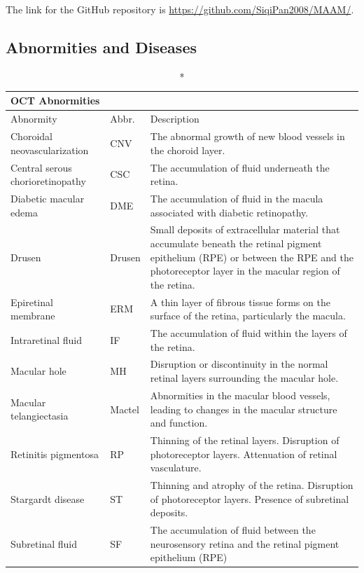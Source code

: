\documentclass{article}
\begin{document}
	The link for the GitHub repository is \url{https://github.com/SiqiPan2008/MAAM/}.
	
	\subsection*{Abnormities and Diseases}
	
	{
		\fontsize{9}{12}\selectfont
		{
			\begin{longtable}{llp{9.5cm}}
				\caption*{OCT Abnormities}
				\label{tb:oct-abnormites}\\
				\toprule
				Abnormity&Abbr.&Description\\
				\toprule
				
				Choroidal neovascularization
				& CNV
				& The abnormal growth of new blood vessels in the choroid layer.\\
				
				Central serous chorioretinopathy
				& CSC
				& The accumulation of fluid underneath the retina.\\
				
				Diabetic macular edema
				& DME
				& The accumulation of fluid in the macula associated with diabetic retinopathy. \\
				
				Drusen
				& Drusen
				& Small deposits of extracellular material that accumulate beneath the retinal pigment epithelium (RPE) or between the RPE and the photoreceptor layer in the macular region of the retina.\\
				
				Epiretinal membrane
				& ERM
				& A thin layer of fibrous tissue forms on the surface of the retina, particularly the macula.\\
				
				Intraretinal fluid
				& IF
				& The accumulation of fluid within the layers of the retina.\\
				
				Macular hole
				& MH
				& Disruption or discontinuity in the normal retinal layers surrounding the macular hole.\\
				
				Macular telangiectasia
				& Mactel
				& Abnormities in the macular blood vessels, leading to changes in the macular structure and function.\\
				
				Retinitis pigmentosa
				& RP
				& Thinning of the retinal layers. Disruption of photoreceptor layers. Attenuation of retinal vasculature.\\
				
				Stargardt disease
				& ST
				& Thinning and atrophy of the retina. Disruption of photoreceptor layers. Presence of subretinal deposits.\\
				
				Subretinal fluid
				& SF
				& The accumulation of fluid between the neurosensory retina and the retinal pigment epithelium (RPE)\\
				
				\bottomrule
			\end{longtable}
		}
	}
	
\end{document}
